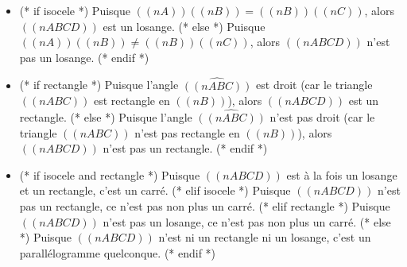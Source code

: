 \begin{enumerate}
  \begin{itemize}
      \item (* if isocele *)
          Puisque $((nA))((nB))=((nB))((nC))$, alors $((nABCD))$ est un losange.
          (* else *)
          Puisque $((nA))((nB))\neq ((nB))((nC))$, alors $((nABCD))$ n'est pas un losange.
          (* endif *)
      \item (* if rectangle *)
          Puisque l'angle $\widehat{((nABC))}$ est droit (car le triangle $((nABC))$ est rectangle en $((nB))$), alors $((nABCD))$ est un rectangle.
          (* else *)
          Puisque l'angle $\widehat{((nABC))}$ n'est pas droit (car le triangle $((nABC))$ n'est pas rectangle en $((nB))$), alors $((nABCD))$ n'est pas un rectangle.
          (* endif *)
      \item (* if isocele and rectangle *)
          Puisque $((nABCD))$ est à la fois un losange et un rectangle, c'est un carré.
          (* elif isocele *)
          Puisque $((nABCD))$ n'est pas un rectangle, ce n'est pas non plus un carré.
          (* elif rectangle *)
          Puisque $((nABCD))$ n'est pas un losange, ce n'est pas non plus un carré.
          (* else *)
          Puisque $((nABCD))$ n'est ni un rectangle ni un losange, c'est un parallélogramme quelconque.
          (* endif *)
  \end{itemize}
\end{enumerate}
